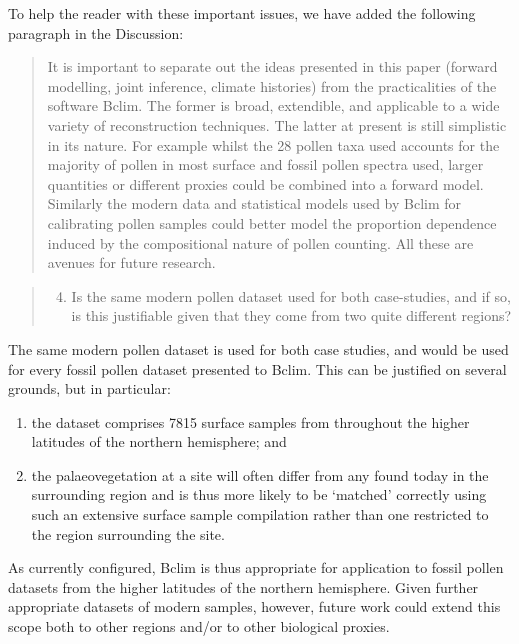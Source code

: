 \documentclass[a4paper,11pt]{article}
\begin{document}
To help the reader with these important issues, we have added the following paragraph in the Discussion:

\begin{quote}
It is important to separate out the ideas presented in this paper (forward modelling, joint inference, climate histories) from the practicalities of the software Bclim. The former is broad, extendible, and applicable to a wide variety of reconstruction techniques. The latter at present is still simplistic in its nature. For example whilst the 28 pollen taxa used accounts for the majority of pollen in most surface and fossil pollen spectra used, larger quantities or different proxies could be combined into a forward model. Similarly the modern data and statistical models used by Bclim for calibrating pollen samples could better model the proportion dependence induced by the compositional nature of pollen counting. All these are avenues for future research.
\end{quote}


\begin{framed} \begin{quote}
\begin{enumerate}
\setcounter{enumi}{3}
\item Is the same modern pollen dataset used for both case-studies, and if so, is this justifiable given that they come from two quite different regions?
\end{enumerate}
\end{quote} \end{framed}

The same modern pollen dataset is used for both case studies, and would be used for every fossil pollen dataset presented to Bclim. This can be justified on several grounds, but in particular: 
\begin{enumerate}
\item the dataset comprises 7815 surface samples from throughout the higher latitudes of the northern hemisphere; and 
\item the palaeovegetation at a site will often differ from any found today in the surrounding region and is thus more likely to be `matched' correctly using such an extensive surface sample compilation rather than one restricted to the region surrounding the site.
\end{enumerate}
As currently configured, Bclim is thus appropriate for application to fossil pollen datasets from the higher latitudes of the northern hemisphere. Given further appropriate datasets of modern samples, however, future work could extend this scope both to other regions and/or to other biological proxies.
\end{document}

